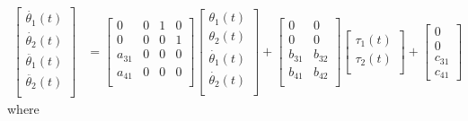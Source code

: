 \begin{equation}
\begin{aligned}
	\begin{bmatrix}
		\dot{\theta_{1}}(t)\\
		\dot{\theta_{2}}(t)\\
		\ddot{\theta_{1}}(t)\\
		\ddot{\theta_{2}}(t)\\
	\end{bmatrix}
	&=
	\begin{bmatrix}
		0 & 0 & 1 & 0\\
		0 & 0 & 0 & 1\\
		a_{31} & 0 & 0 & 0\\
		a_{41} & 0 & 0 & 0\\
	\end{bmatrix}
	\begin{bmatrix}
		\theta_{1}(t)\\
		\theta_{2}(t)\\
		\dot{\theta_{1}}(t)\\
		\dot{\theta_{2}}(t)\\
	\end{bmatrix}
	+
	\begin{bmatrix}
	0 & 0\\
	0 & 0\\
	b_{31} & b_{32}\\
	b_{41} & b_{42}\\
	\end{bmatrix}
	\begin{bmatrix}
		\tau_{1}(t)\\
		\tau_{2}(t)\\
	\end{bmatrix}
	+
	\begin{bmatrix}
		0\\
		0\\
		c_{31}\\
		c_{41}
	\end{bmatrix}
\end{aligned}
\end{equation}
where
